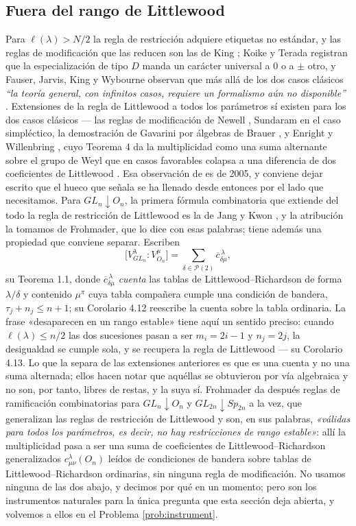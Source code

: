 \documentclass[11pt,reqno]{amsart}
\theoremstyle{plain}
\theoremstyle{definition}
\begin{document}
\subsection{Fuera del rango de Littlewood}\label{sec:unstable}

Para $\ell(\lambda)>N/2$ la regla de restricción adquiere etiquetas no estándar, y las reglas de
modificación que las reducen son las de King \cite{King71}; Koike y Terada
\cite{KT87} registran que la especialización de tipo $D$ manda un carácter universal a
$0$ o a $\pm$ otro, y Fauser, Jarvis, King y Wybourne observan que más allá de los dos casos clásicos
\emph{``la teoría general, con infinitos casos, requiere un formalismo aún no disponible''}
\cite[\S4]{FJKW05}. Extensiones de la regla de Littlewood a todos los parámetros sí existen para los
dos casos clásicos --- las reglas de modificación de Newell \cite{New51}, Sundaram \cite{Sun90} en el
caso simpléctico, la demostración de Gavarini por álgebras de Brauer \cite{Gav99}, y Enright y
Willenbring \cite{EW04}, cuyo Teorema 4 da la multiplicidad como una suma alternante sobre el grupo de
Weyl que en casos favorables colapsa a una diferencia de dos coeficientes de Littlewood
\cite[\S7.11]{EW04}. Esa observación de \cite{FJKW05} es de 2005, y conviene dejar escrito que el
hueco que señala se ha llenado desde entonces por el lado que necesitamos. Para
$GL_n\downarrow O_n$, la primera fórmula combinatoria que extiende del todo la regla de restricción
de Littlewood es la de Jang y Kwon \cite{JK20}, y la atribución la tomamos de Frohmader, que lo dice
con esas palabras; tiene además una propiedad que conviene separar. Escriben
\[
\bigl[V^{\lambda}_{GL_n}:V^{\mu}_{O_n}\bigr]
=\sum_{\delta\in\mathcal P(2)}\overline{c}^{\,\lambda}_{\delta\mu},
\]
su Teorema 1.1, donde $\overline{c}^{\,\lambda}_{\delta\mu}$ \emph{cuenta} las tablas de
Littlewood--Richardson de forma $\lambda/\delta$ y contenido $\mu^{\pi}$ cuya tabla compañera cumple
una condición de bandera, $\tau_j+n_j\le n+1$; su Corolario 4.12 reescribe la cuenta sobre la tabla
ordinaria. La frase «desaparecen en un rango estable» tiene aquí un sentido preciso: cuando
$\ell(\lambda)\le n/2$ las dos sucesiones pasan a ser $m_i=2i-1$ y $n_j=2j$, la desigualdad se cumple
sola, y se recupera la regla de Littlewood --- su Corolario 4.13. Lo que la separa de las extensiones
anteriores es que es una cuenta y no una suma alternada; ellos hacen notar que aquéllas se
obtuvieron por vía algebraica y no son, por tanto, libres de restas, y la suya sí. Frohmader
\cite{Frohmader} da después reglas de ramificación combinatorias para $GL_n\downarrow O_n$ y
$GL_{2n}\downarrow Sp_{2n}$ a la vez, que generalizan las reglas de restricción de Littlewood y son,
en sus palabras, \emph{«válidas para todos los parámetros, es decir, no hay restricciones de rango
estable»}: allí la multiplicidad pasa a ser una suma de coeficientes de Littlewood--Richardson
generalizados $c^{\lambda}_{\mu\nu}(O_n)$ leídos de condiciones de bandera sobre tablas de
Littlewood--Richardson ordinarias, sin ninguna regla de modificación. No usamos ninguna
de las dos abajo, y decimos por qué en un momento; pero son los instrumentos naturales para la única
pregunta que esta sección deja abierta, y volvemos a ellos en el Problema \ref{prob:instrument}.
\end{document}

